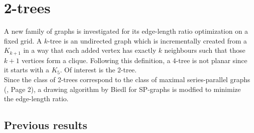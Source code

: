 \section{2-trees}
A new family of graphs is investigated for its edge-length ratio optimization on a fixed grid. A $k$-tree is an undirected graph which is incrementally created from a $K_{k+1}$ in a way that each added vertex has exactly $k$ neighbours such that those $k+1$ vertices form a clique. Following this definition, a $4$-tree is not planar since it starts with a $K_5$. Of interest is the 2-tree. \\
Since the class of 2-trees correspond to the class of maximal series-parallel graphs (\cite{DBLP:journals/corr/abs-2108-12628}, Page 2), a drawing algorithm by Biedl for SP-graphs is modfied to minimize the edge-length ratio. 

\subsection{Previous results}

